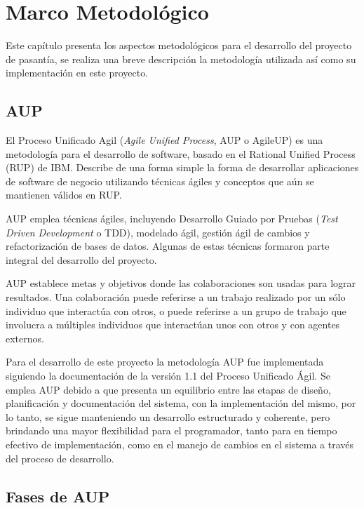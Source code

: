 
\chapter{Marco Metodológico}

\thispagestyle{empty} 

Este capítulo presenta los aspectos metodológicos para el desarrollo
del proyecto de pasantía, se realiza una breve descripción la metodología
utilizada así como su implementación en este proyecto.


\section{AUP}

El Proceso Unificado Agil (\textit{Agile Unified Process}, AUP o AgileUP)
es una metodología para el desarrollo de software, basado en el Rational
Unified Process (RUP) de IBM. Describe de una forma simple la forma
de desarrollar aplicaciones de software de negocio utilizando técnicas
ágiles y conceptos que aún se mantienen válidos en RUP. \cite{Cap3.AUP2}

AUP emplea técnicas ágiles, incluyendo Desarrollo Guiado por Pruebas
(\textit{Test Driven Development} o TDD), modelado ágil, gestión ágil
de cambios y refactorización de bases de datos. Algunas de estas técnicas
formaron parte integral del desarrollo del proyecto. 

AUP establece metas y objetivos donde las colaboraciones son usadas
para lograr resultados. Una colaboración puede referirse a un trabajo
realizado por un sólo individuo que interactúa con otros, o puede
referirse a un grupo de trabajo que involucra a múltiples individuos
que interactúan unos con otros y con agentes externos. \cite{Cap3.AUP1} 

Para el desarrollo de este proyecto la metodología AUP fue implementada
siguiendo la documentación de la versión 1.1 del Proceso Unificado
Ágil. Se emplea AUP debido a que presenta un equilibrio entre las
etapas de diseño, planificación y documentación del sistema, con la
implementación del mismo, por lo tanto, se sigue manteniendo un desarrollo
estructurado y coherente, pero brindando una mayor flexibilidad para
el programador, tanto para en tiempo efectivo de implementación, como
en el manejo de cambios en el sistema a través del proceso de desarrollo.


\section{Fases de AUP}


